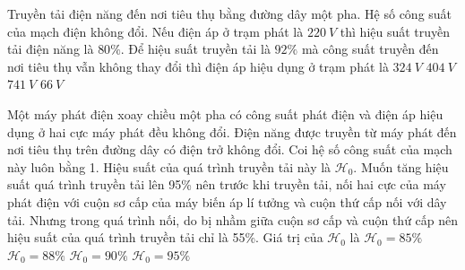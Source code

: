 \begin{vidu}%
	Truyền tải điện năng đến nơi tiêu thụ bằng đường dây một pha. Hệ số công suất của mạch điện không đổi. Nếu điện áp ở trạm phát là $220\ V$ thì hiệu suất truyền tải điện năng là $80\% $. Để hiệu suất truyền tải là $92\%$ mà công suất truyền đến nơi tiêu thụ vẫn không thay đổi thì điện áp hiệu dụng ở trạm phát là
	\choice
	{\True $324\ V$}
	{$404\ V$}
	{$741\ V$}
	{$66\ V$}
\end{vidu}
\begin{vidu}%
	Một máy phát điện xoay chiều một pha có công suất phát điện và điện áp hiệu dụng ở hai cực máy phát đều không đổi. Điện năng được truyền từ máy phát đến nơi tiêu thụ trên đường dây có điện trở không đổi. Coi hệ số công suất của mạch này luôn bằng 1. Hiệu suất của quá trình truyền tải này là $\mathcal{H}_0$. Muốn tăng hiệu suất quá trình truyền tải lên 95\% nên trước khi truyền tải, nối hai cực của máy phát điện với cuộn sơ cấp của máy biến áp lí tưởng và cuộn thứ cấp nối với dây tải. Nhưng trong quá trình nối, do bị nhầm giữa cuộn sơ cấp và cuộn thứ cấp nên hiệu suất của quá trình truyền tải chỉ là 55\%. Giá trị của $\mathcal{H}_0$ là
	\choice
	{\True $\mathcal{H}_0 = 85 \%$}
	{$\mathcal{H}_0 = 88 \%$}
	{$\mathcal{H}_0 = 90 \%$}
	{$\mathcal{H}_0 = 95 \%$}
\end{vidu}
